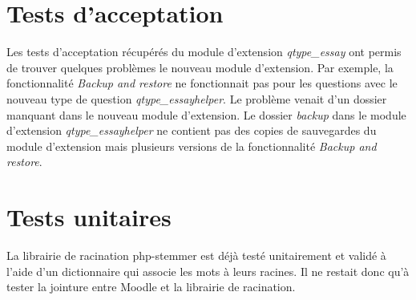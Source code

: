 \section{Tests d'acceptation}

Les tests d'acceptation récupérés du module d'extension \textit{qtype\_essay} ont permis de trouver quelques problèmes le nouveau module d'extension.
Par exemple, la fonctionnalité \textit{Backup and restore} ne fonctionnait pas pour les questions avec le nouveau type de question \textit{qtype\_essayhelper}.
Le problème venait d'un dossier manquant dans le nouveau module d'extension.
Le dossier \textit{backup} dans le module d'extension \textit{qtype\_essayhelper} ne contient pas des copies de sauvegardes du module d'extension mais plusieurs versions de la fonctionnalité \textit{Backup and restore}.

\section{Tests unitaires}

La librairie de racination \og php-stemmer \fg{} est déjà testé unitairement et validé à l'aide d'un dictionnaire qui associe les mots à leurs racines.
Il ne restait donc qu'à tester la jointure entre Moodle et la librairie de racination.